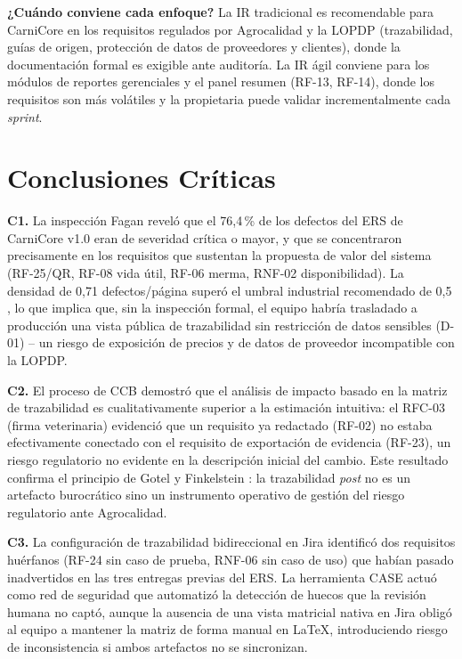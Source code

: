\documentclass[11pt,a4paper]{article}
\begin{document}
\textbf{¿Cuándo conviene cada enfoque?} La IR tradicional es recomendable para CarniCore en los
requisitos regulados por Agrocalidad y la LOPDP (trazabilidad, guías de origen, protección de
datos de proveedores y clientes), donde la documentación formal es exigible ante auditoría. La IR
ágil conviene para los módulos de reportes gerenciales y el panel resumen (RF-13, RF-14), donde
los requisitos son más volátiles y la propietaria puede validar incrementalmente cada \textit{sprint}.

\section{Conclusiones Críticas}
\textbf{C1.} La inspección Fagan reveló que el 76,4\,\% de los defectos del ERS de CarniCore v1.0
eran de severidad crítica o mayor, y que se concentraron precisamente en los requisitos que
sustentan la propuesta de valor del sistema (RF-25/QR, RF-08 vida útil, RF-06 merma, RNF-02
disponibilidad). La densidad de 0,71 defectos/página superó el umbral industrial recomendado de
0,5 \cite{fagan1976}, lo que implica que, sin la inspección formal, el equipo habría trasladado a
producción una vista pública de trazabilidad sin restricción de datos sensibles (D-01) -- un
riesgo de exposición de precios y de datos de proveedor incompatible con la LOPDP.

\textbf{C2.} El proceso de CCB demostró que el análisis de impacto basado en la matriz de
trazabilidad es cualitativamente superior a la estimación intuitiva: el RFC-03 (firma
veterinaria) evidenció que un requisito ya redactado (RF-02) no estaba efectivamente conectado
con el requisito de exportación de evidencia (RF-23), un riesgo regulatorio no evidente en la
descripción inicial del cambio. Este resultado confirma el principio de Gotel y Finkelstein
\cite{gotel1994}: la trazabilidad \textit{post} no es un artefacto burocrático sino un instrumento
operativo de gestión del riesgo regulatorio ante Agrocalidad.

\textbf{C3.} La configuración de trazabilidad bidireccional en Jira identificó dos requisitos
huérfanos (RF-24 sin caso de prueba, RNF-06 sin caso de uso) que habían pasado inadvertidos en
las tres entregas previas del ERS. La herramienta CASE actuó como red de seguridad que
automatizó la detección de huecos que la revisión humana no captó, aunque la ausencia de una
vista matricial nativa en Jira obligó al equipo a mantener la matriz de forma manual en LaTeX,
introduciendo riesgo de inconsistencia si ambos artefactos no se sincronizan.
\end{document}
